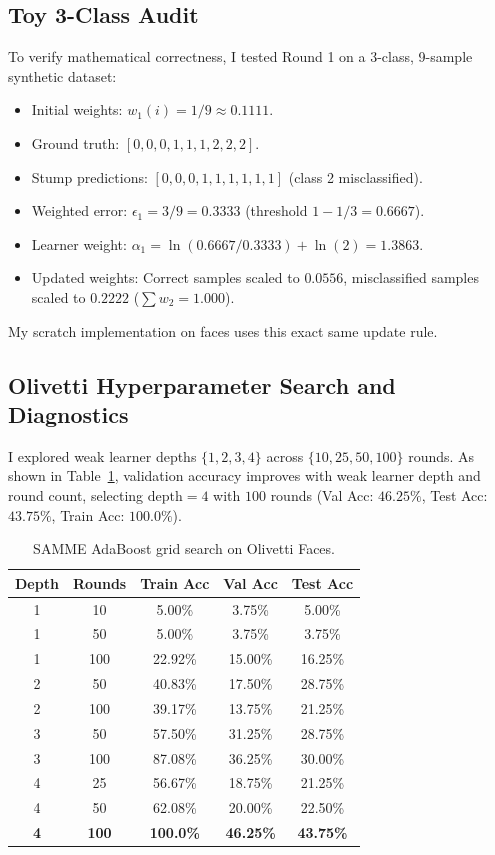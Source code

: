 \documentclass[10pt,twocolumn,letterpaper]{article}
\begin{document}
\subsection{Toy 3-Class Audit}
To verify mathematical correctness, I tested Round 1 on a 3-class, 9-sample synthetic dataset:
\begin{itemize}[leftmargin=*]
    \item Initial weights: $w_1(i) = 1/9 \approx 0.1111$.
    \item Ground truth: $[0,0,0, 1,1,1, 2,2,2]$.
    \item Stump predictions: $[0,0,0, 1,1,1, 1,1,1]$ (class 2 misclassified).
    \item Weighted error: $\epsilon_1 = 3/9 = 0.3333$ (threshold $1 - 1/3 = 0.6667$).
    \item Learner weight: $\alpha_1 = \ln(0.6667 / 0.3333) + \ln(2) = 1.3863$.
    \item Updated weights: Correct samples scaled to $0.0556$, misclassified samples scaled to $0.2222$ ($\sum w_2 = 1.000$).
\end{itemize}
My scratch implementation on faces uses this exact same update rule.

\subsection{Olivetti Hyperparameter Search and Diagnostics}
I explored weak learner depths $\{1, 2, 3, 4\}$ across $\{10, 25, 50, 100\}$ rounds. As shown in Table~\ref{tab:q2_grid}, validation accuracy improves with weak learner depth and round count, selecting $\text{depth}=4$ with $100$ rounds (Val Acc: $46.25\%$, Test Acc: $43.75\%$, Train Acc: $100.0\%$).

\begin{table}[h]
\centering
\small
\caption{SAMME AdaBoost grid search on Olivetti Faces.}
\label{tab:q2_grid}
\begin{tabular}{ccccc}
\toprule
Depth & Rounds & Train Acc & Val Acc & Test Acc \\
\midrule
1 & 10 & 5.00\% & 3.75\% & 5.00\% \\
1 & 50 & 5.00\% & 3.75\% & 3.75\% \\
1 & 100 & 22.92\% & 15.00\% & 16.25\% \\
2 & 50 & 40.83\% & 17.50\% & 28.75\% \\
2 & 100 & 39.17\% & 13.75\% & 21.25\% \\
3 & 50 & 57.50\% & 31.25\% & 28.75\% \\
3 & 100 & 87.08\% & 36.25\% & 30.00\% \\
4 & 25 & 56.67\% & 18.75\% & 21.25\% \\
4 & 50 & 62.08\% & 20.00\% & 22.50\% \\
\textbf{4} & \textbf{100} & \textbf{100.0\%} & \textbf{46.25\%} & \textbf{43.75\%} \\
\bottomrule
\end{tabular}
\end{table}
\end{document}
